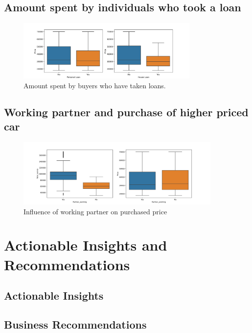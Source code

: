 \documentclass[12pt,a4paper]{style}
\begin{document}
    \subsection{Amount spent by individuals who took a loan}
    	\begin{figure}[h]
    	\includegraphics[width=0.8\textwidth]{buyers_with_loan.png}
    	\caption{Amount spent by buyers who have taken loans.}
    	\end{figure}
    
    \subsection{Working partner and purchase of higher priced car}

    	\begin{figure}[h]
    		\centering
			\includegraphics[width=0.9\textwidth]{partner_working_and_price.png}
			\caption{Influence of working partner on purchased price}
		\end{figure}
    \section{Actionable Insights and Recommendations}
    \subsection{Actionable Insights}
    \subsection{Business Recommendations}
    
\end{document}
